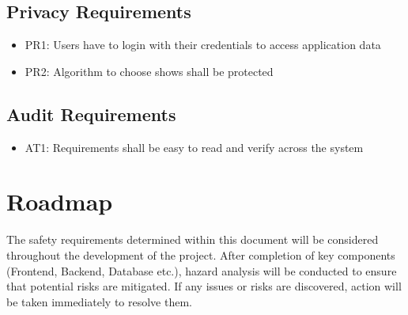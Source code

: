 \documentclass[12pt]{article}
\begin{document}
\subsection{Privacy Requirements}
\begin{itemize}
	\item PR1: Users have to login with their credentials to access application data
	\item PR2: Algorithm to choose shows shall be protected
\end{itemize}

\subsection{Audit Requirements}
\begin{itemize}
	\item AT1: Requirements shall be easy to read and verify across the system
\end{itemize}

\section{Roadmap}
The safety requirements determined within this document will be considered throughout the development of the project. After completion of key components (Frontend, Backend, Database etc.), hazard analysis will be conducted to ensure that potential risks are mitigated. If any issues or risks are discovered, action will be taken immediately to resolve them.
\end{document}
